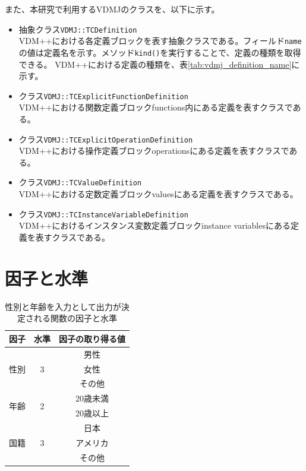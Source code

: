 \documentclass[uplatex, report, a4j, 10pt]{jsbook}
\newcommand\ttt[1]{\texttt{#1}}
\begin{document}
また、本研究で利用するVDMJのクラスを、以下に示す。

\begin{itemize}
  \item 抽象クラス\ttt{VDMJ::TCDefinition}\\
        VDM++における各定義ブロックを表す抽象クラスである。フィールド\ttt{name}の値は定義名を示す。メソッド\ttt{kind()}を実行することで、定義の種類を取得できる。
        VDM++における定義の種類を、表\ref{tab:vdmj_definition_name}に示す。
  \item クラス\ttt{VDMJ::TCExplicitFunctionDefinition}\\
        VDM++における関数定義ブロックfunctions内にある定義を表すクラスである。
  \item クラス\ttt{VDMJ::TCExplicitOperationDefinition}\\
        VDM++における操作定義ブロックoperationsにある定義を表すクラスである。
  \item クラス\ttt{VDMJ::TCValueDefinition}\\
        VDM++における定数定義ブロックvaluesにある定義を表すクラスである。
  \item クラス\ttt{VDMJ::TCInstanceVariableDefinition}\\
        VDM++におけるインスタンス変数定義ブロックinstance variablesにある定義を表すクラスである。
\end{itemize}

\section{因子と水準}\label{sec:factor_and_level}
\begin{table}[tp]
  \begin{center}
    \caption{性別と年齢を入力として出力が決定される関数の因子と水準}
    \label{tab:factor_level}
    \begin{tabular}{c|c|c}
      因子                    & 水準     & 因子の取り得る値 \\
      \hline
      \hline
                              &          & 男性             \\  \cline{3-3}
      性別                    & 3        & 女性             \\ \cline{3-3}
                              &          & その他           \\ \hline
      \multirow{2}{*}{年齢} & \multirow{2}{*}{2} & 20歳未満  \\ \cline{3-3}
       & & 20歳以上                                              \\ \hline
                              &          & 日本             \\  \cline{3-3}
       国籍                    & 3        & アメリカ             \\ \cline{3-3}
                               &          & その他           \\ \hline 
    \end{tabular}
  \end{center}
\end{table}
\end{document}

